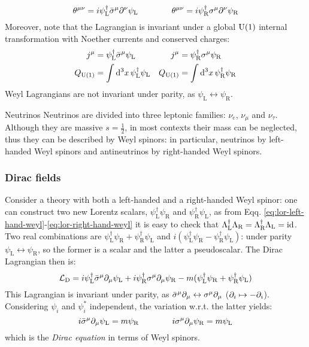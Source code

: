 \begin{equation}
  \theta^{\mu \nu} = i \psi_\text{L}^\dagger \bar{\sigma}^\mu \partial^\nu \psi_\text{L}
  \qquad \qquad
  \theta^{\mu \nu} = i \psi_\text{R}^\dagger \sigma^\mu \partial^\nu \psi_\text{R}
\end{equation}
Moreover, note that the Lagrangian is invariant under a global $ \mathrm{U}(1) $ internal transformation with Noether currents and conserved charges:
\begin{align*}
  j^\mu &= \psi_\text{L}^\dagger \bar{\sigma}^\mu \psi_\text{L} & j^\mu &= \psi_\text{R}^\dagger \sigma^\mu \psi_\text{R} \\
  Q_{\mathrm{U}(1)} &= \int \mathrm{d}^3x\, \psi_\text{L}^\dagger \psi_\text{L} & Q_{\mathrm{U}(1)} &= \int \mathrm{d}^3x\, \psi_\text{R}^\dagger \psi_\text{R}
\end{align*}
Weyl Lagrangians are not invariant under parity, as $ \psi_\text{L} \leftrightarrow \psi_\text{R} $.

\begin{example}{Neutrinos}{}
  Neutrinos are divided into three leptonic families: $ \nu_e $, $ \nu_\mu $ and $ \nu_\tau $. Although they are massive $ s = \frac{1}{2} $, in most contexts their mass can be neglected, thus they can be described by Weyl spinors: in particular, neutrinos by left-handed Weyl spinors and antineutrinos by right-handed Weyl spinors.
\end{example}

\subsubsection{Dirac fields}

Consider a theory with both a left-handed and a right-handed Weyl spinor: one can construct two new Lorentz scalars, $ \psi_\text{L}^\dagger \psi_\text{R} $ and $ \psi_\text{R}^\dagger \psi_\text{L} $, as from Eqq. \ref{eq:lor-left-hand-weyl}-\ref{eq:lor-right-hand-weyl} it is easy to check that $ \Lambda_\text{L}^\dagger \Lambda_\text{R} = \Lambda_\text{R}^\dagger \Lambda_\text{L} = \operatorname{id} $. Two real combinations are $ \psi_\text{L}^\dagger \psi_\text{R} + \psi_\text{R}^\dagger \psi_\text{L} $ and $ i (\psi_\text{L}^\dagger \psi_\text{R} - \psi_\text{R}^\dagger \psi_\text{L}) $: under parity $ \psi_\text{L} \leftrightarrow \psi_\text{R} $, so the former is a scalar and the latter a pseudoscalar. The Dirac Lagrangian then is:
\begin{equation}
  \mathcal{L}_\text{D} = i \psi_\text{L}^\dagger \bar{\sigma}^\mu \partial_\mu \psi_\text{L} + i \psi_\text{R}^\dagger \sigma^\mu \partial_\mu \psi_\text{R} - m ( \psi_\text{L}^\dagger \psi_\text{R} + \psi_\text{R}^\dagger \psi_\text{L} )
\end{equation}
This Lagrangian is invariant under parity, as $ \bar{\sigma}^\mu \partial_\mu \leftrightarrow \sigma^\mu \partial_\mu $ ($ \partial_i \mapsto - \partial_i $). Considering $ \psi_i $ and $ \psi_i^* $ independent, the variation w.r.t. the latter yields:
\begin{equation}
  i \bar{\sigma}^\mu \partial_\mu \psi_\text{L} = m \psi_\text{R}
  \qquad \qquad
  i \sigma^\mu \partial_\mu \psi_\text{R} = m \psi_\text{L}
\end{equation}
which is the \textit{Dirac equation} in terms of Weyl spinors.

